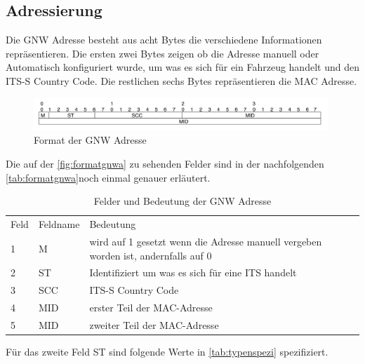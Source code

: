 \subsection{Adressierung} 
Die \acl{GNW} Adresse besteht aus acht Bytes die verschiedene Informationen repräsentieren. Die ersten zwei Bytes zeigen ob die Adresse manuell oder Automatisch konfiguriert wurde, um was es sich für ein Fahrzeug handelt und den ITS-S Country Code. Die restlichen sechs Bytes repräsentieren die MAC Adresse.\cite{etsi302636-4-1}
\begin{figure}
\includegraphics[width=0.99\textwidth]{content/images/03_networklayer/gnwadress.jpg}
\caption{Format der \acl{GNW} Adresse}
\label{fig:formatgnwa}
\end{figure}
Die auf der \autoref{fig:formatgnwa} zu sehenden Felder sind in der nachfolgenden \autoref{tab:formatgnwa}noch einmal genauer erläutert.
\begin{table}[h]
\caption{Felder und Bedeutung der \acs{GNW} Adresse\cite{etsi302636-4-1}}
\begin{tabular}{lll}
Feld & Feldname & Bedeutung \\
    1 & M       & wird auf 1 gesetzt wenn die Adresse manuell vergeben worden ist, andernfalls auf 0          \\
    2 & ST    & Identifiziert um was es sich für eine ITS handelt       \\
    3 & SCC   &   ITS-S Country Code        \\
    4 & MID    &    erster Teil der MAC-Adresse       \\
    5 & MID     &   zweiter Teil der MAC-Adresse        \\
\end{tabular}
\label{tab:formatgnwa}
\end{table}

Für das zweite Feld ST sind folgende Werte in \autoref{tab:typenspezi} spezifiziert.

